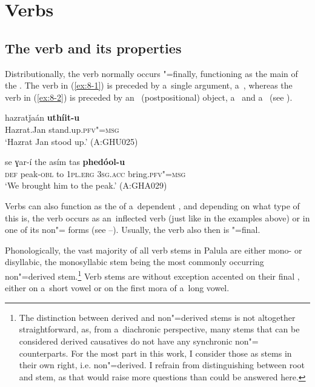\chapter{Verbs}
\label{chap:8}

\section{The verb and its properties}
\label{sec:8-1}



Distributionally, the verb normally occurs "=finally, functioning as the main  of the . The verb in (\ref{ex:8-1}) is preceded by a~single argument, a~, whereas the verb in (\ref{ex:8-2}) is preceded by an~ (postpositional) object, a~ and a~ (see ).

\begin{exe}
\ex
\label{ex:8-1}
\gll hazratǰaán \textbf{uthíit-u} \\
Hazrat.Jan stand.up.\textsc{pfv"=msg} \\
\glt `Hazrat Jan stood up.' (A:GHU025)
\end{exe}
\begin{exe}
\ex
\label{ex:8-2}
\gll se ɣar-í the asím tas \textbf{phedóol-u} \\
\textsc{def} peak-\textsc{obl} to \textsc{1pl.erg} \textsc{3sg.acc} bring.\textsc{pfv"=msg} \\
\glt `We brought him to the peak.' (A:GHA029)
\end{exe}

Verbs can also function as the  of a~dependent , and depending on what type of  this is, the verb occurs as an~inflected  verb (just like in the examples above) or in one of its non"= forms (see --). Usually, the verb also then is "=final.


Phonologically, the vast majority of all verb stems in Palula are either mono- or disyllabic, the monosyllabic stem being the most commonly occurring non"=derived stem.\footnote{The distinction between derived and non"=derived stems is not altogether straightforward, as, from a~diachronic perspective, many  stems that can be considered derived causatives do not have any synchronic non"= counterparts. For the most part in this work, I consider those as stems in their own right, i.e. non"=derived. I refrain from distinguishing between root and stem, as that would raise more questions than could be answered here.} Verb stems are without exception accented on their final , either on a~short vowel or on the first mora of a~long vowel. 


